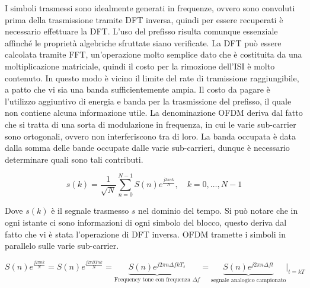 I simboli trasmessi sono idealmente generati in frequenze, ovvero sono convoluti prima della trasmissione tramite DFT inversa, quindi per essere recuperati è necessario effettuare la DFT. L'uso del prefisso risulta comunque essenziale affinché le proprietà algebriche sfruttate siano verificate. 
La DFT può essere calcolata tramite FFT, un'operazione molto semplice dato che è costituita da una moltiplicazione matriciale, quindi il costo per la rimozione dell'ISI è molto contenuto. In questo modo è vicino il limite del rate di tramissione raggiungibile, a patto che vi sia una banda sufficientemente ampia.
Il costo da pagare è l'utilizzo aggiuntivo di energia e banda per la trasmissione del prefisso, il quale non contiene alcuna informazione utile.
La denominazione OFDM deriva dal fatto che si tratta di una sorta di modulazione in frequenza, in cui le varie sub-carrier sono ortogonali, ovvero non interferiscono tra di loro. La banda occupata è data dalla somma delle bande occupate dalle varie sub-carrieri, dunque è necessario determinare quali sono tali contributi.

\[
    s(k) = \frac{1}{\sqrt{N}} \sum_{n=0}^{N-1} S(n) e^{\frac{j2\pi nk}{N}}, \quad k = 0, \ldots, N-1
\]

Dove $s(k)$ è il segnale trasmesso $s$ nel dominio del tempo. Si può notare che in ogni istante ci sono informazioni di ogni simbolo del blocco, questo deriva dal fatto che vi è stata l'operazione di DFT inversa. OFDM tramette i simboli in parallelo sulle varie sub-carrier. 


\[
    S(n) e^{\frac{j2\pi nk}{N}} = S(n) e^{\frac{j2\pi BTnk}{N}} = \underbrace{S(n) e^{j2\pi n\Delta f k T_s}}_{\text{Frequency tone con frequenza $\Delta f$}} = \underbrace{S(n) e^{j 2 \pi n \Delta f t}}_{\text{segnale analogico campionato}} \bigg|_{t=kT}
\]


